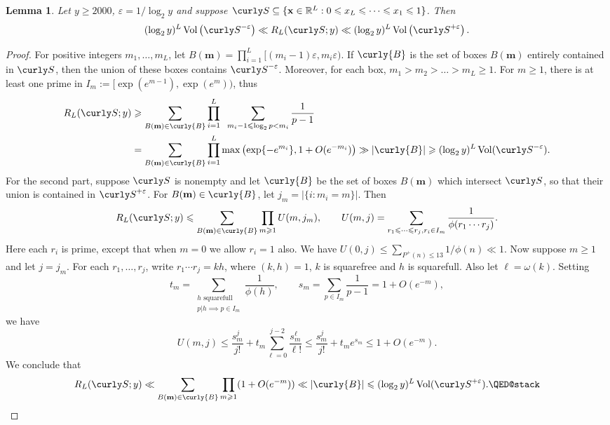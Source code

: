 \documentclass[11pt]{amsart}
\theoremstyle{remark}
\theoremstyle{plain}
\newtheorem{lem}{Lemma}[section]
\numberwithin{equation}{section}
\newcommand{\RR}{{\mathbb R}}
\newcommand{\e}{\ensuremath{\varepsilon}}
\renewcommand{\(}{\left(}
\renewcommand{\)}{\right)}
\newcommand{\fancyS}{{\curly S}}
\newcommand{\fancyB}{{\curly{B}}}
\renewcommand{\le}{\leqslant}
\renewcommand{\ge}{\geqslant}
\newcommand{\vx}{\mathbf{x}}
\newcommand{\vm}{\mathbf{m}}
\DeclareMathOperator{\vvol}{Vol}
\begin{document}
\begin{lem}\label{sumvol}
Let $y\ge 2000$, $\e = 1/\log_2 y$ and suppose $\fancyS \subseteq
\{ \vx\in \RR^L : 0\le x_L \le \cdots \le x_1\le 1\}$. 
Then
$$
(\log_2 y)^L \vvol\(\fancyS^{-\e}\) \ll R_L(\fancyS;y) \ll (\log_2 y)^L \vvol\(\fancyS^{+\e}\).
$$
\end{lem}

\begin{proof}
For positive integers $m_1,\ldots,m_L$, let $B(\vm)=\prod_{i=1}^L
 [(m_i-1)\e,m_i\e)$.  If $\fancyB$ is the set of boxes $B(\vm)$ entirely
 contained in $\fancyS$, then the union of these boxes contains
 $\fancyS^{-\e}$.  Moreover, for each box, $m_1>m_2>\ldots>m_L\ge 1$.
For $m\ge 1$, there is at least one prime 
in $I_m := [\exp (e^{m-1}),\exp (e^m))$, thus
\begin{align*}
R_L(\fancyS;y)  &\ge \sum_{B(\vm)\in \fancyB} \prod_{i=1}^L \;\;
\sum_{m_i-1 \le \log_2 p < m_i} \frac{1}{p-1} \\
&=\sum_{B(\vm)\in \fancyB} \prod_{i=1}^L \max\(\exp \{-e^{m_i}\}, 1+O(e^{-m_i})\) 
\gg|\fancyB| \ge (\log_2 y)^L \vvol(\fancyS^{-\e}).
\end{align*}
For the second part, suppose $\fancyS$ is nonempty and let $\fancyB$ 
be the set of boxes $B(\vm)$ which
intersect $\fancyS$, so that their union is contained in $\fancyS^{+\e}$.
For $B(\vm)\in \fancyB$,
let $j_m=|\{i : m_i=m\}|$.  Then
\[
R_L(\fancyS;y)  \le \sum_{B(\vm)\in \fancyB} \prod_{m\ge 1} U(m,j_m),
\qquad U(m,j)=\sum_{r_1\le \cdots \le r_j, r_i\in I_m}
\frac{1}{\phi(r_1\cdots r_j)}.
\]
Here each $r_i$ is prime, except that when $m=0$ we allow $r_i=1$ also.
We have $U(0,j)\le \sum_{P^+(n)\le 13} 1/\phi(n) \ll 1$.  Now suppose $m\ge 1$ and let
$j=j_m$.  For each $r_1,\ldots,r_j$, write $r_1\cdots r_j=kh$, where $(k,h)=1$,
$k$ is squarefree and $h$ is squarefull.  Also let  $\ell = \omega(k)$.
Setting
\[
 t_m=\sum_{\substack{h\text{ squarefull}\\ p|h\implies p\in I_m}} \frac{1}{\phi(h)},
\qquad s_m=\sum_{p\in I_m} \frac{1}{p-1}=1+O(e^{-m}),
\]
we have
\[
 U(m,j)\le \frac{s_m^j}{j!} + t_m \sum_{\ell=0}^{j-2} \frac{s_m^\ell}{\ell!}
\le  \frac{s_m^j}{j!}+ t_m e^{s_m} \le 1 + O(e^{-m}).
\]
We conclude that
\[
 R_L(\fancyS;y) \ll \sum_{B(\vm)\in \fancyB} \prod_{m\ge 1} (1+O(e^{-m})) \ll
|\fancyB| \le (\log_2 y)^L \vvol(\fancyS^{+\e}). \qedhere
\]
\end{proof}
\end{document}
